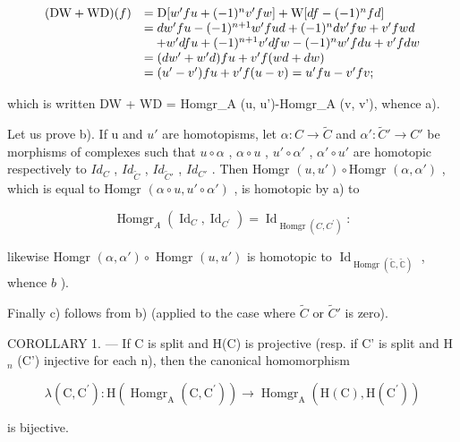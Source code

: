 \[
\begin{array}{r l} (\mathrm{DW} + \mathrm{WD}) (f) & = \mathrm{D} [ w ^ {\prime} f u + (- 1) ^ {n} v ^ {\prime} f w ] + \mathrm{W} [ d f - (- 1) ^ {n} f d ] \\ & = d w ^ {\prime} f u - (- 1) ^ {n + 1} w ^ {\prime} f u d + (- 1) ^ {n} d v ^ {\prime} f w + v ^ {\prime} f w d \\ & \quad + w ^ {\prime} d f u + (- 1) ^ {n + 1} v ^ {\prime} d f w - (- 1) ^ {n} w ^ {\prime} f d u + v ^ {\prime} f d w \\ & = (d w ^ {\prime} + w ^ {\prime} d) f u + v ^ {\prime} f (w d + d w) \\ & = (u ^ {\prime} - v ^ {\prime}) f u + v ^ {\prime} f (u - v) = u ^ {\prime} f u - v ^ {\prime} f v; \end{array}
\]

which is written DW + WD = Homgr\_A (u, u')-Homgr\_A (v, v'), whence a).

Let us prove b). If u and \(u'\) are homotopisms, let \(\alpha: C \to \tilde{C}\) and \(\alpha': \tilde{C}' \to C'\) be morphisms of complexes such that \(u \circ \alpha\) , \(\alpha \circ u\) , \(u' \circ \alpha'\) , \(\alpha' \circ u'\) are homotopic respectively to \(Id_{C}\) , \(Id_{\tilde{C}}\) , \(Id_{\tilde{C}'}\) , \(Id_{C'}\) . Then Homgr \((u, u') \circ \text{Homgr } (\alpha, \alpha')\) , which is equal to Homgr \((\alpha \circ u, u' \circ \alpha')\) , is homotopic by a) to

\[
\operatorname{Homgr} _ {A} \left(\operatorname{Id} _ {C}, \operatorname{Id} _ {C ^ {\prime}}\right) = \operatorname{Id} _ {\operatorname{Homgr} (C, C ^ {\prime})}:
\]

likewise Homgr \((\alpha, \alpha') \circ\) Homgr \((u, u')\) is homotopic to \(\operatorname{Id}_{\operatorname{Homgr}(\tilde{\mathbb{C}}, \tilde{\mathbb{C}})}\) , whence \(b\) ).

Finally c) follows from b) (applied to the case where \(\tilde{C}\) or \(\tilde{C}'\) is zero).

COROLLARY 1. --- If C is split and H(C) is projective (resp. if C' is split and H \(_{n}\) (C') injective for each n), then the canonical homomorphism

\[
\lambda (\mathrm{C}, \mathrm{C} ^ {\prime}): \mathrm{H} (\operatorname{Homgr} _ {\mathrm{A}} (\mathrm{C}, \mathrm{C} ^ {\prime})) \rightarrow \operatorname{Homgr} _ {\mathrm{A}} (\mathrm{H} (\mathrm{C}), \mathrm{H} (\mathrm{C} ^ {\prime}))
\]

is bijective.

